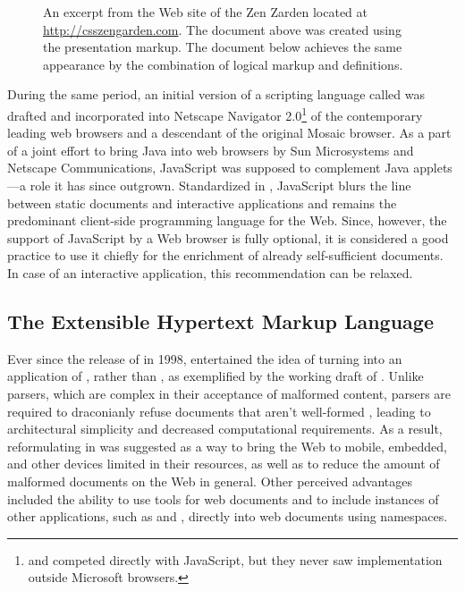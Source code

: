 \documentclass[a5paper,10pt]{book}
\begin{document}
\begin{figure}
  \caption{An excerpt from the Web site of the  Zen Zarden
    located at \protect\url{http://csszengarden.com}. The document above was
    created using the  presentation markup. The document below
    achieves the same appearance by the combination of logical markup and
     definitions.}\bigskip
\end{figure}

During the same period, an initial version of a scripting language called
 \cite{ecma97} was drafted and incorporated into Netscape
Navigator 2.0\footnote{
   and  competed directly with JavaScript, but they
  never saw implementation outside Microsoft browsers.
} of the contemporary leading web browsers and a descendant of the original
Mosaic browser. As a part of a joint effort to bring Java into web browsers by
Sun Microsystems and Netscape Communications, JavaScript was supposed to
complement Java applets \cite{netscape95}---a role it has since outgrown.
Standardized in \citeyear{ecma97}, JavaScript blurs the line between static
documents and interactive applications and remains the predominant client-side
programming language for the Web. Since, however, the support of JavaScript by a
Web browser is fully optional, it is considered a good practice to use it
chiefly for the enrichment of already self-sufficient  documents.
In case of an interactive application, this recommendation can be relaxed.

\subsection{The Extensible Hypertext Markup Language}
Ever since the release of  in 1998,  entertained the
idea of turning  into an application of , rather than
, as exemplified by the working draft of \textcite{raggett98}.
Unlike  parsers, which are complex in their acceptance of
malformed content,  parsers are required to draconianly refuse
 documents that aren't well-formed \cite[Section~1.2,
Terminology]{bray98}, leading to architectural simplicity and decreased
computational requirements. As a result, reformulating  in
 was suggested as a way to bring the Web to mobile, embedded, and
other devices limited in their resources, as well as to reduce the amount of
malformed documents on the Web in general. Other perceived advantages included
the ability to use  tools for web documents and to include
instances of other  applications, such as  and
, directly into web documents using  namespaces.
\end{document}
